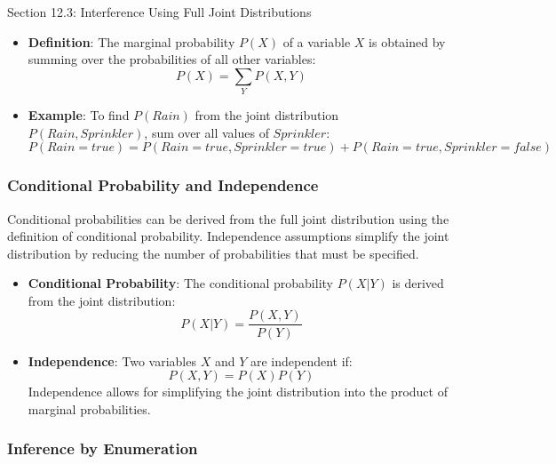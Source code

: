 \begin{notes}{Section 12.3: Interference Using Full Joint Distributions}
    \begin{highlight}[Marginalization]
    
        \begin{itemize}
            \item \textbf{Definition}: The marginal probability $P(X)$ of a variable $X$ is obtained by summing over the probabilities of all other variables:
            \[
            P(X) = \sum_{Y} P(X, Y)
            \]
            \item \textbf{Example}: To find $P(Rain)$ from the joint distribution $P(Rain, Sprinkler)$, sum over all values of $Sprinkler$:
            \[
            P(Rain = true) = P(Rain = true, Sprinkler = true) + P(Rain = true, Sprinkler = false)
            \]
        \end{itemize}
    
    \end{highlight}
    
    \subsubsection*{Conditional Probability and Independence}
    
    Conditional probabilities can be derived from the full joint distribution using the definition of conditional probability. Independence assumptions simplify the joint distribution by reducing the number 
    of probabilities that must be specified.
    
    \begin{highlight}
    
        \begin{itemize}
            \item \textbf{Conditional Probability}: The conditional probability $P(X | Y)$ is derived from the joint distribution:
            \[
            P(X | Y) = \frac{P(X, Y)}{P(Y)}
            \]
            \item \textbf{Independence}: Two variables $X$ and $Y$ are independent if:
            \[
            P(X, Y) = P(X)P(Y)
            \]
            Independence allows for simplifying the joint distribution into the product of marginal probabilities.
        \end{itemize}
    
    \end{highlight}
    
    \subsubsection*{Inference by Enumeration}
    

\end{notes}
